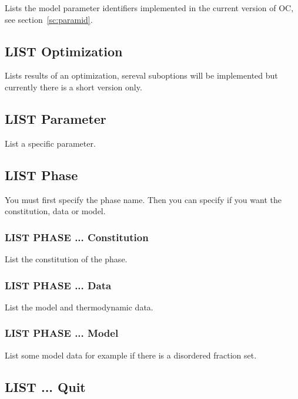 \documentclass[12pt]{article}
\begin{document}
Lists the model parameter identifiers implemented in the current
version of OC, see section~\ref{sc:paramid}.

\subsection{LIST Optimization}

Lists results of an optimization, sereval suboptions will be
implemented but currently there is a short version only.

\subsection{LIST Parameter}

List a specific parameter.

\subsection{LIST Phase}

You must first specify the phase name.  Then you can specify if you
want the constitution, data or model.

\subsubsection{LIST PHASE ... Constitution}

List the constitution of the phase.

\subsubsection{LIST PHASE ... Data}

List the model and thermodynamic data.

\subsubsection{LIST PHASE ... Model}

List some model data for example if there is a disordered fraction set.

\subsection{LIST ... Quit}
\end{document}
